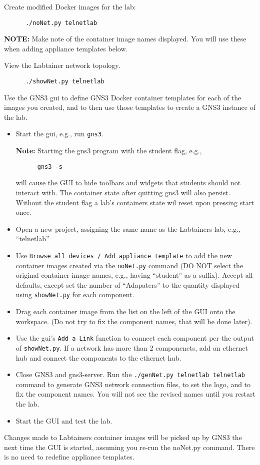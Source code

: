 \documentclass[12pt]{article}
\begin{document}
Create modified Docker images for the lab:
\begin{verbatim}
      ./noNet.py telnetlab
\end{verbatim}
\noindent \textbf{NOTE:} Make note of the container image names displayed.  You will use these when adding appliance templates below.

View the Labtainer network topology.
\begin{verbatim}
      ./showNet.py telnetlab
\end{verbatim}
\noindent Use the GNS3 gui to define GNS3 Docker container templates for each of the 
images you created, and to then use those templates to create a GNS3 instance of 
the lab.
\begin{itemize}
	\item Start the gui, e.g., run {\tt gns3}.  
	
	{\bf Note:} Starting the gns3 program with the \-\-student flag, e.g., 
	\begin{verbatim}	
	  gns3 -s 
	\end{verbatim}		
	will cause the GUI to hide toolbars and widgets that students should not interact with. The container state after quitting gns3 will also persist. Without the student flag a lab's containers state wil reset upon pressing start once.
	\item Open a new project, assigning the same name as the Labtainers lab, e.g., ``telnetlab''
	\item Use {\tt Browse all devices / Add appliance template} to add the new container images created
		via the {\tt noNet.py} command (DO NOT select the original container image names, e.g., having ``student'' as a suffix).  
Accept all defaults, except set the number of ``Adapaters'' to
		the quantity displayed using {\tt showNet.py} for each component.
	\item Drag each container image from the list on the left of the GUI onto the workspace.  (Do not try to fix
		the component names, that will be done later).
	\item Use the gui's {\tt Add a Link} function to connect each component per the output of {\tt showNet.py}. If a network has more than 2 componenets, add an ethernet hub and connect the components to the ethernet hub.
	\item Close GNS3 and gns3-server. Run the {\tt ./genNet.py telnetlab telnetlab} command to generate GNS3 network connection files, to set the logo, and to
		fix the component names.  You will not see the revised names until you restart the lab.
	\item Start the GUI and test the lab.
\end{itemize}
Changes made to Labtainers container images will be picked up by GNS3 the next time the GUI is started,
assuming you re-run the noNet.py command.  There is no need to redefine appliance templates.
\end{document}
